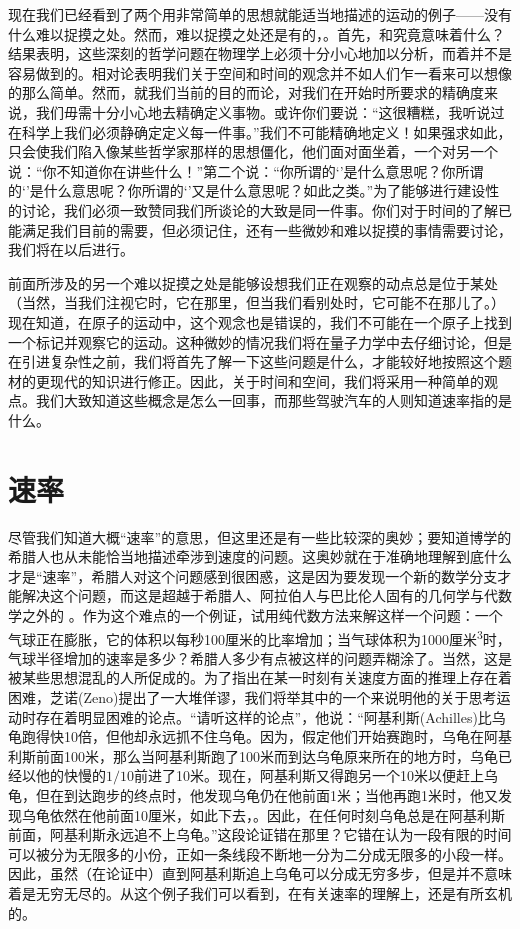 现在我们已经看到了两个用非常简单的思想就能适当地描述的运动的例子——没有什么难以捉摸之处。然而，难以捉摸之处还是有的，。首先，和究竟意味着什么？结果表明，这些深刻的哲学问题在物理学上必须十分小心地加以分析，而着并不是容易做到的。相对论表明我们关于空间和时间的观念并不如人们乍一看来可以想像的那么简单。然而，就我们当前的目的而论，对我们在开始时所要求的精确度来说，我们毋需十分小心地去精确定义事物。或许你们要说：“这很糟糕，我听说过在科学上我们必须静确定定义每一件事。”我们不可能精确地定义！如果强求如此，只会使我们陷入像某些哲学家那样的思想僵化，他们面对面坐着，一个对另一个说：“你不知道你在讲些什么！”第二个说：“你所谓的‘’是什么意思呢？你所谓的‘’是什么意思呢？你所谓的‘’又是什么意思呢？如此之类。”为了能够进行建设性的讨论，我们必须一致赞同我们所谈论的大致是同一件事。你们对于时间的了解已能满足我们目前的需要，但必须记住，还有一些微妙和难以捉摸的事情需要讨论，我们将在以后进行。

前面所涉及的另一个难以捉摸之处是能够设想我们正在观察的动点总是位于某处（当然，当我们注视它时，它在那里，但当我们看别处时，它可能不在那儿了。）现在知道，在原子的运动中，这个观念也是错误的，我们不可能在一个原子上找到一个标记并观察它的运动。这种微妙的情况我们将在量子力学中去仔细讨论，但是在引进复杂性之前，我们将首先了解一下这些问题是什么，才能较好地按照这个题材的更现代的知识进行修正。因此，关于时间和空间，我们将采用一种简单的观点。我们大致知道这些概念是怎么一回事，而那些驾驶汽车的人则知道速率指的是什么。

\section{速率}

尽管我们知道大概“速率”的意思，但这里还是有一些比较深的奥妙；要知道博学的希腊人也从未能恰当地描述牵涉到速度的问题。这奥妙就在于准确地理解到底什么才是“速率”，希腊人对这个问题感到很困惑，这是因为要发现一个新的数学分支才能解决这个问题，而这是超越于希腊人、阿拉伯人与巴比伦人固有的几何学与代数学之外的 。作为这个难点的一个例证，试用纯代数方法来解这样一个问题：一个气球正在膨胀，它的体积以每秒100厘米的比率增加；当气球体积为1000\si{厘米^3}时，气球半径增加的速率是多少？希腊人多少有点被这样的问题弄糊涂了。当然，这是被某些思想混乱的人所促成的。为了指出在某一时刻有关速度方面的推理上存在着困难，芝诺(Zeno)提出了一大堆佯谬，我们将举其中的一个来说明他的关于思考运动时存在着明显困难的论点。“请听这样的论点”，他说：“阿基利斯(Achilles)比乌龟跑得快10倍，但他却永远抓不住乌龟。因为，假定他们开始赛跑时，乌龟在阿基利斯前面100米，那么当阿基利斯跑了100米而到达乌龟原来所在的地方时，乌龟已经以他的快慢的$1/10$前进了10米。现在，阿基利斯又得跑另一个10米以便赶上乌龟，但在到达跑步的终点时，他发现乌龟仍在他前面1米；当他再跑1米时，他又发现乌龟依然在他前面10厘米，如此下去，。因此，在任何时刻乌龟总是在阿基利斯前面，阿基利斯永远追不上乌龟。”这段论证错在那里？它错在认为一段有限的时间可以被分为无限多的小份，正如一条线段不断地一分为二分成无限多的小段一样。因此，虽然（在论证中）直到阿基利斯追上乌龟可以分成无穷多步，但是并不意味着是无穷无尽的。从这个例子我们可以看到，在有关速率的理解上，还是有所玄机的。

